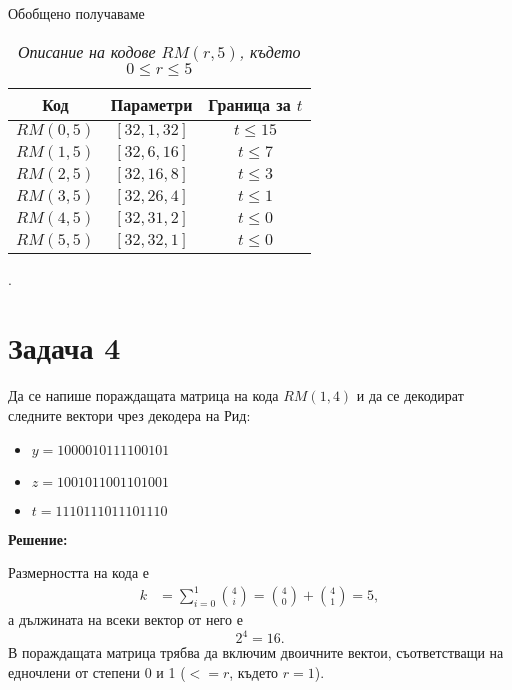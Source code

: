 \documentclass[11pt, oneside]{article}   	%
\begin{document}
Обобщено получаваме

\begin{table}[htbp]
    \centering
    \begin{tabular}{ccc}
        \toprule
            \textbf{Код} & \textbf{Параметри} & \textbf{Граница за $t$} \\
        \midrule
            $ RM(0, 5) $ & $ [32, 1, 32] $ & $ t \leq 15 $ \\
            $ RM(1, 5) $ & $ [32, 6, 16] $ & $ t \leq 7 $ \\
            $ RM(2, 5) $ & $ [32, 16, 8] $ & $ t \leq 3 $ \\
            $ RM(3, 5) $ & $ [32, 26, 4] $ & $ t \leq 1 $ \\
            $ RM(4, 5) $ & $ [32, 31, 2] $ & $ t \leq 0 $ \\
            $ RM(5, 5) $ & $ [32, 32, 1] $ & $ t \leq 0 $ \\
        \bottomrule
    \end{tabular}
    \caption{\textit{Описание на кодове $RM(r, 5)$, където $0 \leq r \leq 5$}}.
\end{table}

\section*{Задача 4}
Да се напише пораждащата матрица на кода $RM(1, 4)$ и да се декодират следните вектори чрез декодера на Рид:
\begin{itemize}
  \item $y = 1000 0101 1110 0101$
  \item $z = 1001 0110 0110 1001$
  \item $t = 1110 1110 1110 1110$
\end{itemize}

\textbf{Решение:}

Размерността на кода е
\begin{align*}
    k &= \sum_{i=0}^{1} \binom{4}{i} = \binom{4}{0} + \binom{4}{1} = 5,
\end{align*}
а дължината на всеки вектор от него е \[2^{4} = 16.\]
В пораждащата матрица трябва да включим двоичните вектои, съответстващи на едночлени от степени 0 и 1 ($<= r$, където $r = 1$).
\end{document}
